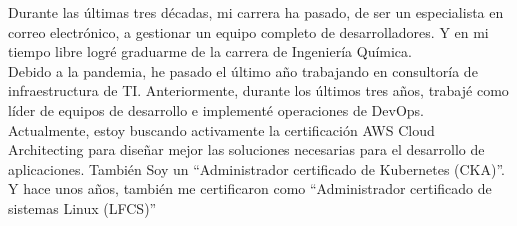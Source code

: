 \documentclass[letter,10pt]{article}
\begin{document}


\hspace*{10mm}Durante las últimas tres décadas, mi carrera ha pasado, de ser un especialista en correo electrónico, a gestionar un equipo completo de desarrolladores.  Y en mi tiempo libre logré graduarme de la carrera de Ingeniería Química.\\
\vspace*{3mm}
\hspace*{10mm}Debido a la pandemia, he pasado el último año trabajando en consultoría de infraestructura de TI. Anteriormente, durante los últimos tres años, trabajé como líder de equipos de desarrollo e implementé operaciones de DevOps.\\
\vspace*{3mm}
\hspace*{10mm}Actualmente, estoy buscando activamente la certificación AWS Cloud Architecting para diseñar mejor las soluciones necesarias para el desarrollo de aplicaciones. También Soy un ``Administrador certificado de Kubernetes (CKA)''. Y hace unos años, también me certificaron como ``Administrador certificado de sistemas Linux (LFCS)''
\end{document}
